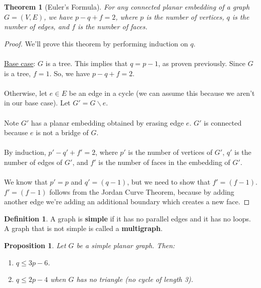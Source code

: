 \documentclass[]{article}
\newtheorem*{theorem}{Theorem}
\newtheorem*{proposition}{Proposition}
\theoremstyle{definition}
\newtheorem*{defn}{Definition}
\newcommand{\lecture}[1]{\marginpar{{\footnotesize $\leftarrow$ \underline{#1}}}}
\begin{document}
			\begin{theorem}[Euler's Formula]
				For any connected planar embedding of a graph $G = (V, E)$, we have $p - q + f = 2$, where $p$ is the number of vertices, $q$ is the number of edges, and $f$ is the number of faces.
			\end{theorem}

			\begin{proof}
				We'll prove this theorem by performing induction on $q$.
				\\ \\
				\underline{Base case}: $G$ is a tree. This implies that $q = p - 1$, as proven previously. Since $G$ is a tree, $f = 1$. So, we have $p - q + f = 2$.
				\\ \\
				Otherwise, let $e \in E$ be an edge in a cycle (we can assume this because we aren't in our base case). Let $G' = G \backslash e$.
				\\ \\
				Note $G'$ has a planar embedding obtained by erasing edge $e$. $G'$ is connected because $e$ is not a bridge of $G$.
				\\ \\
				By induction, $p' - q' + f' = 2$, where $p'$ is the number of vertices of $G'$, $q'$ is the number of edges of $G'$, and $f'$ is the number of faces in the embedding of $G'$.
				\\ \\
				We know that $p' = p$ and $q' = (q - 1)$, but we need to show that $f' = (f - 1)$. $f' = (f - 1)$ follows from the Jordan Curve Theorem, because by adding another edge we're adding an additional boundary which creates a new face.
			\end{proof}

			\begin{defn} \lecture{March 15, 2013}
				A graph is \textbf{simple} if it has no parallel edges and it has no loops. A graph that is not simple is called a \textbf{multigraph}.
			\end{defn}

			\begin{proposition}
				Let $G$ be a simple planar graph. Then:
				\begin{enumerate}
					\item $q \le 3p - 6$.
					\item $q \le 2p - 4$ when $G$ has no triangle (no cycle of length 3).
				\end{enumerate}
			\end{proposition}
\end{document}
